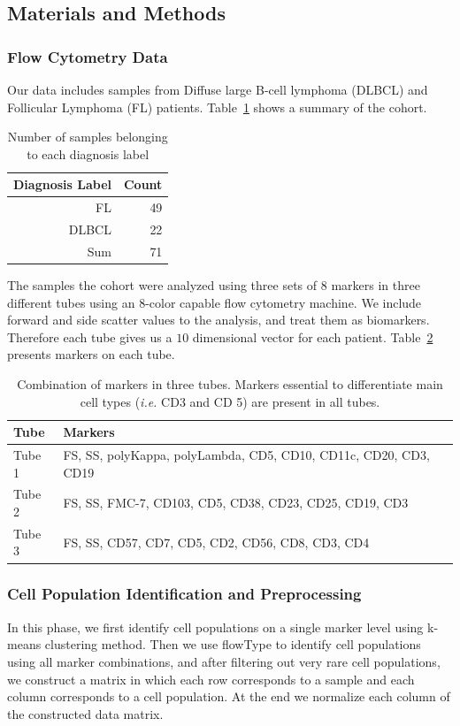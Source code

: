 \subsection{Materials and Methods}
\subsubsection{Flow Cytometry Data}
Our data includes samples from Diffuse large B-cell lymphoma (DLBCL) and Follicular Lymphoma (FL) patients. Table~\ref{tbl:fcs-qa-cohorts} shows a summary of the cohort.

\begin{table}[!ht]
  \centering
  \begin{tabular}{rr}
  	Diagnosis Label & Count \\ \hline
    FL & 49\\
    DLBCL & 22 \\ 
    Sum & 71
  \end{tabular}
  \caption{Number of samples belonging to each diagnosis label}
  \label{tbl:fcs-qa-cohorts}
\end{table}

The samples the cohort were analyzed using three sets of 8 markers in three different tubes using an 8-color capable flow cytometry machine. We include forward and side scatter values to the analysis, and treat them as biomarkers. Therefore each tube gives us a $10$ dimensional vector for each patient. Table~\ref{tbl:fcs-qa-markers} presents markers on each tube.

\begin{table}[!ht]
  \centering
  \begin{tabular}{lm{7cm}}
    Tube & Markers \\ \hline
    Tube 1 & FS, SS, polyKappa, polyLambda, CD5, CD10, CD11c, CD20, CD3, CD19 \\
    Tube 2 & FS, SS, FMC-7, CD103, CD5, CD38, CD23, CD25, CD19, CD3 \\
    Tube 3 & FS, SS, CD57, CD7, CD5, CD2, CD56, CD8, CD3, CD4 \\ \hline
  \end{tabular}
  \caption{Combination of markers in three tubes. Markers essential to differentiate main cell types (\emph{i.e.} CD3 and CD 5) are present in all tubes.}
  \label{tbl:fcs-qa-markers}
\end{table}


\subsubsection{Cell Population Identification and Preprocessing}
In this phase, we first identify cell populations on a single marker level using k-means clustering method. Then we use flowType to identify cell populations using all marker combinations, and after filtering out very rare cell populations, we construct a matrix in which each row corresponds to a sample and each column corresponds to a cell population. At the end we normalize each column of the constructed data matrix.

